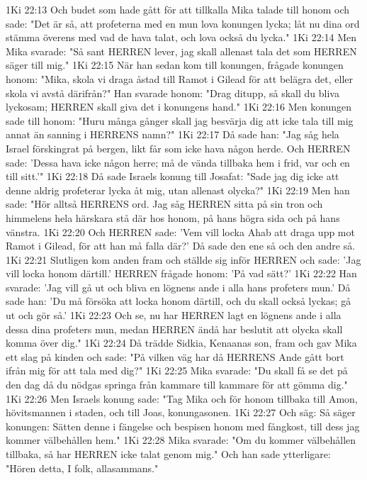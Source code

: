 1Ki 22:13  Och budet som hade gått för att tillkalla Mika talade till honom och sade: "Det är så, att profeterna med en mun lova konungen lycka; låt nu dina ord stämma överens med vad de hava talat, och lova också du lycka."
1Ki 22:14  Men Mika svarade: "Så sant HERREN lever, jag skall allenast tala det som HERREN säger till mig."
1Ki 22:15  När han sedan kom till konungen, frågade konungen honom: "Mika, skola vi draga åstad till Ramot i Gilead för att belägra det, eller skola vi avstå därifrån?" Han svarade honom: "Drag ditupp, så skall du bliva lyckosam; HERREN skall giva det i konungens hand."
1Ki 22:16  Men konungen sade till honom: "Huru många gånger skall jag besvärja dig att icke tala till mig annat än sanning i HERRENS namn?"
1Ki 22:17  Då sade han: "Jag såg hela Israel förskingrat på bergen, likt får som icke hava någon herde. Och HERREN sade: 'Dessa hava icke någon herre; må de vända tillbaka hem i frid, var och en till sitt.'"
1Ki 22:18  Då sade Israels konung till Josafat: "Sade jag dig icke att denne aldrig profeterar lycka åt mig, utan allenast olycka?"
1Ki 22:19  Men han sade: "Hör alltså HERRENS ord. Jag såg HERREN sitta på sin tron och himmelens hela härskara stå där hos honom, på hans högra sida och på hans vänstra.
1Ki 22:20  Och HERREN sade: 'Vem vill locka Ahab att draga upp mot Ramot i Gilead, för att han må falla där?' Då sade den ene så och den andre så.
1Ki 22:21  Slutligen kom anden fram och ställde sig inför HERREN och sade: 'Jag vill locka honom därtill.' HERREN frågade honom: 'På vad sätt?'
1Ki 22:22  Han svarade: 'Jag vill gå ut och bliva en lögnens ande i alla hans profeters mun.' Då sade han: 'Du må försöka att locka honom därtill, och du skall också lyckas; gå ut och gör så.'
1Ki 22:23  Och se, nu har HERREN lagt en lögnens ande i alla dessa dina profeters mun, medan HERREN ändå har beslutit att olycka skall komma över dig."
1Ki 22:24  Då trädde Sidkia, Kenaanas son, fram och gav Mika ett slag på kinden och sade: "På vilken väg har då HERRENS Ande gått bort ifrån mig för att tala med dig?"
1Ki 22:25  Mika svarade: "Du skall få se det på den dag då du nödgas springa från kammare till kammare för att gömma dig."
1Ki 22:26  Men Israels konung sade: "Tag Mika och för honom tillbaka till Amon, hövitsmannen i staden, och till Joas, konungasonen.
1Ki 22:27  Och säg: Så säger konungen: Sätten denne i fängelse och bespisen honom med fångkost, till dess jag kommer välbehållen hem."
1Ki 22:28  Mika svarade: "Om du kommer välbehållen tillbaka, så har HERREN icke talat genom mig." Och han sade ytterligare: "Hören detta, I folk, allasammans."
